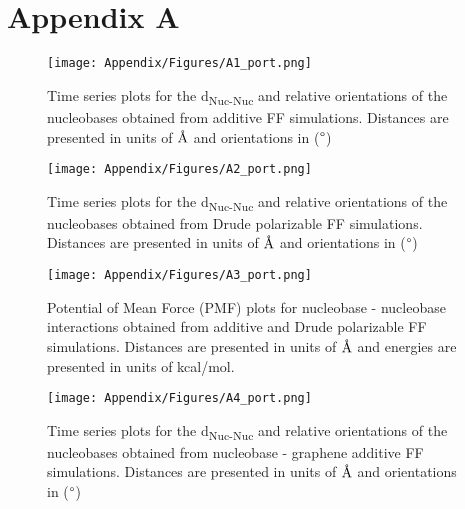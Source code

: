 \chapter{Appendix A}
\renewcommand{\thefigure}{A.\arabic{figure}}
\begin{figure}
    \centering
    \texttt{[image: Appendix/Figures/A1\_port.png]}
    \caption[Time series plots for the d\textsubscript{Nuc-Nuc} and relative orientations of the nucleobases obtained from additive FF simulations]{Time series plots for the d\textsubscript{Nuc-Nuc} and relative orientations of the nucleobases obtained from additive FF simulations. Distances are presented in units of $\text{\normalfont\AA}$ and orientations in ($\degree$)}
\end{figure}

\begin{figure}
    \centering
    \texttt{[image: Appendix/Figures/A2\_port.png]}
    \caption[Time series plots for the d\textsubscript{Nuc-Nuc} and relative orientations of the nucleobases obtained from Drude polarizable FF simulations]{Time series plots for the d\textsubscript{Nuc-Nuc} and relative orientations of the nucleobases obtained from Drude polarizable FF simulations. Distances are presented in units of $\text{\normalfont\AA}$ and orientations in ($\degree$)}
\end{figure}

\begin{figure}
    \centering
    \texttt{[image: Appendix/Figures/A3\_port.png]}
    \caption[Potential of Mean Force (PMF) plots for nucleobase - nucleobase interactions obtained from additive and Drude polarizable FF simulations]{Potential of Mean Force (PMF) plots for nucleobase - nucleobase interactions obtained from additive and Drude polarizable FF simulations. Distances are presented in units of $\text{\normalfont\AA}$ and energies are presented in units of kcal/mol.}
\end{figure}

\begin{figure}
    \centering
    \texttt{[image: Appendix/Figures/A4\_port.png]}
    \caption[Time series plots for the d\textsubscript{Nuc-Graph} and relative orientations of the nucleobases obtained from nucleobase - graphene additive FF simulations]{Time series plots for the d\textsubscript{Nuc-Nuc} and relative orientations of the nucleobases obtained from nucleobase - graphene additive FF simulations. Distances are presented in units of $\text{\normalfont\AA}$ and orientations in ($\degree$)}
\end{figure}

